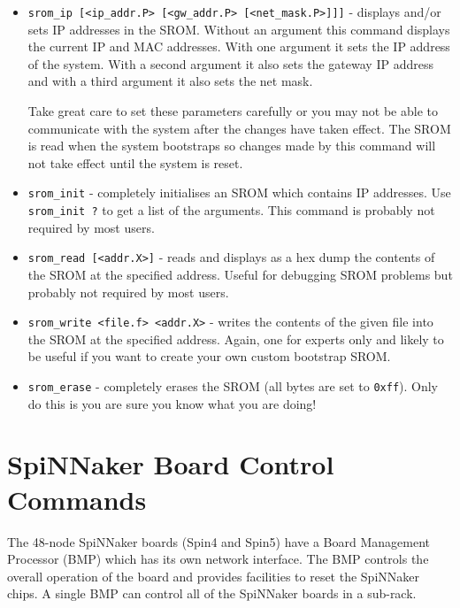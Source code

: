 \begin{itemize}

\item
\texttt{srom\_ip [<ip\_addr.P> [<gw\_addr.P> [<net\_mask.P>]]]} -
displays and/or sets IP addresses in the SROM. Without an argument
this command displays the current IP and MAC addresses. With one
argument it sets the IP address of the system. With a second argument
it also sets the gateway IP address and with a third argument it also
sets the net mask.

Take great care to set these parameters carefully or you may not be
able to communicate with the system after the changes have taken
effect. The SROM is read when the system bootstraps so changes made by
this command will not take effect until the system is reset.

\item
\texttt{srom\_init} - completely initialises an SROM which contains
IP addresses. Use \texttt{srom\_init ?} to get a list of the
arguments. This command is probably not required by most users.

\item
\texttt{srom\_read [<addr.X>]} - reads and displays as a hex dump the
contents of the SROM at the specified address. Useful for debugging
SROM problems but probably not required by most users.

\item
\texttt{srom\_write <file.f> <addr.X>} - writes the contents of the
given file into the SROM at the specified address. Again, one for
experts only and likely to be useful if you want to create your own
custom bootstrap SROM.

\item
\texttt{srom\_erase} - completely erases the SROM (all bytes are set to
\texttt{0xff}). Only do this is you are sure you know what you are
doing!

\end{itemize}

\section{SpiNNaker Board Control Commands}

The 48-node SpiNNaker boards (Spin4 and Spin5) have a Board Management
Processor (BMP) which has its own network interface. The BMP controls
the overall operation of the board and provides facilities to reset
the SpiNNaker chips. A single BMP can control all of the SpiNNaker
boards in a sub-rack.

